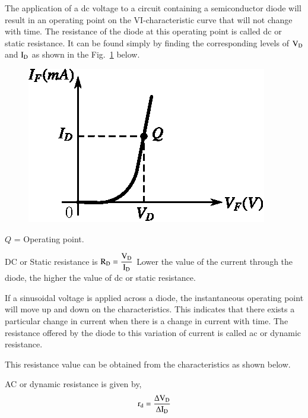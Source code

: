 \smallskip
{}

The application of a dc voltage to a circuit containing a semiconductor diode will result in an operating point on the VI-characteristic curve that will not change with time. The resistance of the diode at this operating point is called dc or static resistance. It can be found simply by finding the corresponding levels of $\textrm{V}_{\textrm{D}}$ and $\textrm{I}_{\textrm{D}}$ as shown in the Fig.~\ref{fig1.21} below.
\begin{figure}[H]
\centering
\includegraphics{chap1/fig1.21.eps}
\caption{}\label{fig1.21}
\end{figure}

$Q$ = Operating point.

DC or Static resistance is $\textrm{R}_{\textrm{D}}=\dfrac{\textrm{V}_{\textrm{D}}}{\textrm{I}_{\textrm{D}}}$ Lower the value of the current through the diode, the higher the value of dc or static resistance.

\smallskip
{}
\smallskip

If a sinusoidal voltage is applied across a diode, the instantaneous operating point will move up and down on the characteristics. This indicates that there exists a particular change in current when there is a change in current with time. The resistance offered by the diode to this variation of current is called ac or dynamic resistance.

This resistance value can be obtained from the characteristics as shown below.

AC or dynamic resistance is given by,
$$
\textrm{r}_{\textrm{d}}=\dfrac{\Delta \textrm{V}_{\textrm{D}}}{\Delta \textrm{I}_{\textrm{D}}}
$$

